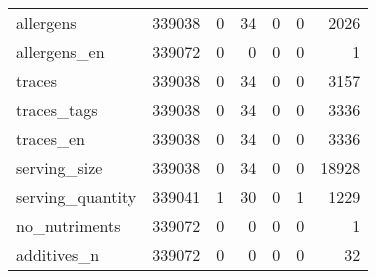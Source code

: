 \begin{tabular}{lrrrrrr}
allergens                                  &                                        339038 &                                         0 &                                            34 &                                         0 &                      0 &             2026 \\
allergens\_en                               &                                        339072 &                                         0 &                                             0 &                                         0 &                      0 &                1 \\
traces                                     &                                        339038 &                                         0 &                                            34 &                                         0 &                      0 &             3157 \\
traces\_tags                                &                                        339038 &                                         0 &                                            34 &                                         0 &                      0 &             3336 \\
traces\_en                                  &                                        339038 &                                         0 &                                            34 &                                         0 &                      0 &             3336 \\
serving\_size                               &                                        339038 &                                         0 &                                            34 &                                         0 &                      0 &            18928 \\
serving\_quantity                           &                                        339041 &                                         1 &                                            30 &                                         0 &                      1 &             1229 \\
no\_nutriments                              &                                        339072 &                                         0 &                                             0 &                                         0 &                      0 &                1 \\
additives\_n                                &                                        339072 &                                         0 &                                             0 &                                         0 &                      0 &               32 \\

\end{tabular}
